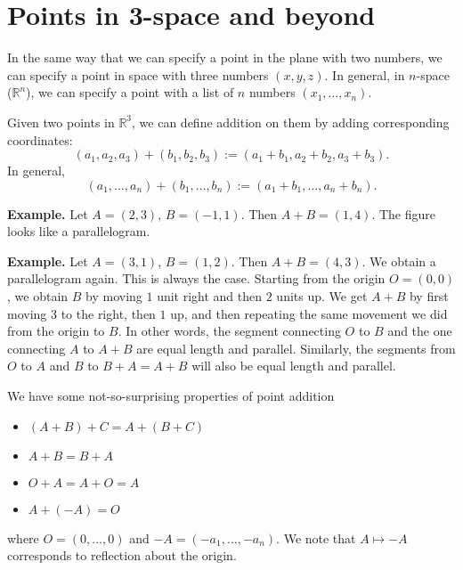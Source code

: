 \documentclass{article}
\begin{document}





\section*{Points in 3-space and beyond}

In the same way that we can specify a point in the plane with 
two numbers, we can specify a point in space with three numbers
$(x,y,z)$. In general, in $n$-space ($\mathbb{R}^n$), we can specify
a point with a list of $n$ numbers $(x_1,\ldots,x_n)$.

Given two points in $\mathbb{R}^3$, we can define addition on them 
by adding corresponding coordinates:
\[(a_1,a_2,a_3)+(b_1,b_2,b_3):=(a_1+b_1, a_2+b_2, a_3+b_3).\]
In general,
\[(a_1,\ldots,a_n)+(b_1,\ldots,b_n):=(a_1+b_1,\ldots,a_n+b_n).\]

\textbf{Example.}
Let $A=(2,3)$, $B=(-1,1)$. Then $A+B=(1,4)$.
The figure looks like a parallelogram.

\textbf{Example.}
Let $A=(3,1)$, $B=(1,2)$. Then $A+B=(4,3)$.
We obtain a parallelogram again. This is always the case.
Starting from the origin $O=(0,0)$, we obtain $B$ by moving $1$
unit right and then $2$ units up. We get $A+B$ by first moving 
$3$ to the right, then $1$ up, and then repeating the same movement 
we did from the origin to $B$. In other words, the segment connecting
$O$ to $B$ and the one connecting $A$ to $A+B$ are equal length and parallel.
Similarly, the segments from $O$ to $A$ and $B$ to $B+A = A+B$ will also be equal length and parallel.

We have some not-so-surprising properties of point addition
\begin{itemize}
    \item $(A+B)+C=A+(B+C)$
    \item $A + B = B + A$
    \item $O + A = A + O = A$
    \item $A + (-A) = O$
\end{itemize}
where $O=(0,\ldots,0)$ and $-A = (-a_1, \ldots, -a_n)$.
We note that $A \mapsto -A$ corresponds to reflection about the origin.
\end{document}
